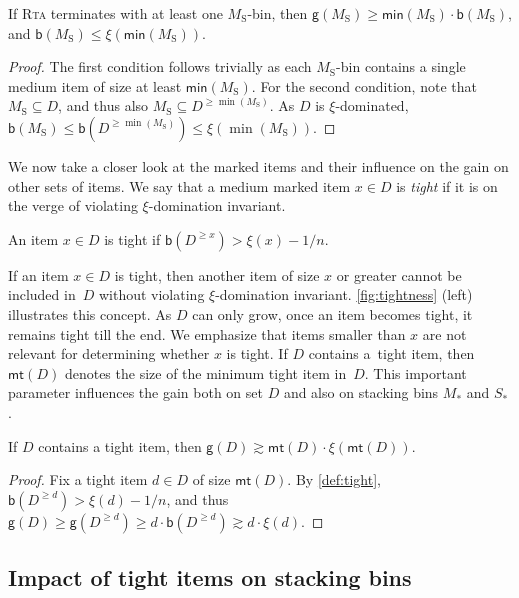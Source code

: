 \documentclass[a4paper,USenglish,cleveref]{lipics-v2019}
\newcommand{\M}{\ensuremath{M_\mathrm{S}}\xspace}
\newcommand{\ST}{\ensuremath{S_*}\xspace}
\newcommand{\MT}{\ensuremath{M_*}\xspace}
\newcommand{\D}{\ensuremath{D}\xspace}
\newcommand{\g}{\ensuremath{\xi}}
\newcommand{\B}{\textsf{b}}
\newcommand{\gain}{\textsf{g}}
\newcommand{\mn}{\textsf{min}}
\newcommand{\mt}{\textsf{mt}(\D)}
\newcommand{\ALG}{\textsc{Rta}\xspace}
\begin{document}
\begin{lemma}
\label{lem:M-gain}
If \ALG terminates with at least one \M-bin, then $\gain(\M) \geq \mn(\M) \cdot \B(\M)$, 
and $\B(\M) \leq \g(\mn(\M))$. 
\end{lemma}

\begin{proof}
The first condition follows trivially as each \M-bin contains a single medium
item of size at least $\mn(\M)$. For the second condition, note that $\M \subseteq \D$, 
and thus also $\M \subseteq \D^{\geq \min(\M)}$. As \D is
\g-dominated, $\B(\M) \leq \B(D^{\geq \min(\M)}) \leq \g(\min(\M))$.
\end{proof}

We now take a closer look at the marked items and their influence on the gain on
other sets of items. We say that a medium marked item $x \in \D$ is
\emph{tight} if it is on the verge of violating $\g$-domination invariant.

\begin{definition}
\label{def:tight}
An item $x \in \D$ is tight if $\B(\D^{\geq x}) > \g(x) - 1/n$.
\end{definition}

If an item $x \in \D$ is tight, then another item of size $x$ or greater cannot
be included in~$\D$ without violating $\g$-domination invariant.
\cref{fig:tightness} (left) illustrates this concept. As $\D$ can only grow,
once an item becomes tight, it remains tight till the end. We emphasize that
items smaller than $x$ are not relevant for determining whether $x$ is tight. If
$\D$ contains a~tight item, then $\mt$ denotes the size of the minimum tight
item in~$\D$. This important parameter influences the gain both on set $D$ and
also on stacking bins $\MT$ and $\ST$.

\begin{lemma}
\label{lem:D-gain}
If $\D$ contains a tight item, then $\gain(\D) \gtrsim \mt \cdot \g(\mt)$.
\end{lemma}

\begin{proof}
Fix a tight item $d \in \D$ of size $\mt$. By \cref{def:tight},
$\B(\D^{\geq d}) > \g(d) - 1/n$, and thus $\gain(\D) \geq \gain(\D^{\geq d}) \geq d
\cdot \B(\D^{\geq d}) \gtrsim d \cdot \g(d)$.
\end{proof}



\subsection{Impact of tight items on stacking bins}
\end{document}
